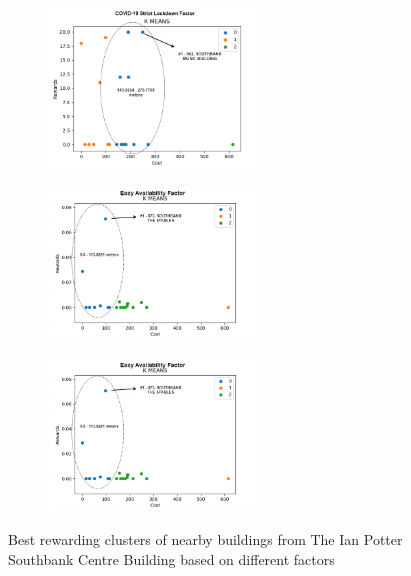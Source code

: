 \begin{itemize}
\begin{figure}[H]
\centering
\begin{subfigure}[b]{0.30\textwidth}
  \centering
  \includegraphics[width=5.5cm,keepaspectratio=true]{resources/images/spatial-tr/880_covidplot.png}
\end{subfigure}
\begin{subfigure}[b]{0.30\textwidth}
  \centering
  \includegraphics[width=5.5cm,keepaspectratio=true]{resources/images/spatial-tr/880_easyplot.png}
\end{subfigure}
\begin{subfigure}[b]{0.30\textwidth}
  \centering
  \includegraphics[width=5.5cm,keepaspectratio=true]{resources/images/spatial-tr/880_easyplot.png}
\end{subfigure}
\caption{Best rewarding clusters of nearby buildings from The Ian Potter Southbank Centre Building based on different factors}
\label{fig:ian_factors}
\end{figure}
\end{itemize}


